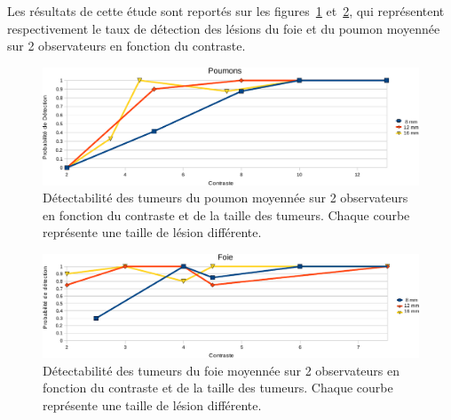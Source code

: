 Les résultats de cette étude sont reportés sur les figures~\ref{fig:calibration} et~\ref{fig:calibrationFoie}, qui représentent respectivement le taux de détection des lésions du foie et du poumon moyennée sur 2 observateurs en fonction du contraste.




\begin{figure}[h!]
\centering
\includegraphics[width=16cm]{images/calibration_crop}
\caption[Détectabilité des tumeurs du poumon en fonction du contraste et de la taille des tumeurs]{Détectabilité des tumeurs du poumon moyennée sur 2 observateurs en fonction du contraste et de la taille des tumeurs. Chaque courbe représente une taille de lésion différente.} 
\label{fig:calibration}
\end{figure}

\begin{figure}[h!]
\centering
\includegraphics[width=16cm]{images/calibrationFoie_crop}
\caption[Détectabilité des tumeurs du foie en fonction du contraste et de la taille des tumeurs]{Détectabilité des tumeurs du foie moyennée sur 2 observateurs en fonction du contraste et de la taille des tumeurs. Chaque courbe représente une taille de lésion différente.} 
\label{fig:calibrationFoie}
\end{figure}


